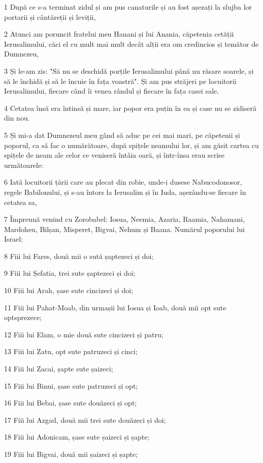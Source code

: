 \par 1 După ce s-a terminat zidul și am pus canaturile și au fost așezați la slujba lor portarii și cântăreții și leviții,
\par 2 Atunci am poruncit fratelui meu Hanani și lui Anania, căpetenia cetății Ierusalimului, căci el cu mult mai mult decât alții era om credincios și temător de Dumnezeu,
\par 3 Și le-am zis: "Să nu se deschidă porțile Ierusalimului până nu răsare soarele, și să le închidă și să le încuie în fața voastră". Și am pus străjeri pe locuitorii Ierusalimului, fiecare când îi venea rândul și fiecare în fața casei sale.
\par 4 Cetatea însă era întinsă și mare, iar popor era puțin în ea și case nu se zidiseră din nou.
\par 5 Și mi-a dat Dumnezeul meu gând să aduc pe cei mai mari, pe căpetenii și poporul, ca să fac o numărătoare, după spițele neamului lor, și am găsit cartea cu spițele de neam ale celor ce veniseră întâia oară, și într-însa erau scrise următoarele:
\par 6 Iată locuitorii țării care au plecat din robie, unde-i dusese Nabucodonosor, regele Babilonului, și s-au întors la Ierusalim și în Iuda, așezându-se fiecare în cetatea sa,
\par 7 Împreună venind cu Zorobabel: Iosua, Neemia, Azaria, Raamia, Nahamani, Mardoheu, Bilșan, Misperet, Bigvai, Nehum și Baana. Numărul poporului lui Israel:
\par 8 Fiii lui Fares, două mii o sută șaptezeci și doi;
\par 9 Fiii lui Șefatia, trei sute șaptezeci și doi;
\par 10 Fiii lui Arah, șase sute cincizeci și doi;
\par 11 Fiii lui Pahat-Moab, din urmașii lui Iosua și Ioab, două mii opt sute optsprezece;
\par 12 Fiii lui Elam, o mie două sute cincizeci și patru;
\par 13 Fiii lui Zatu, opt sute patruzeci și cinci;
\par 14 Fiii lui Zacai, șapte sute șaizeci;
\par 15 Fiii lui Binui, șase sute patruzeci și opt;
\par 16 Fiii lui Bebai, șase sute douăzeci și opt;
\par 17 Fiii lui Azgad, două mii trei sute douăzeci și doi;
\par 18 Fiii lui Adonicam, șase sute șaizeci și șapte;
\par 19 Fiii lui Bigvai, două mii șaizeci și șapte;
